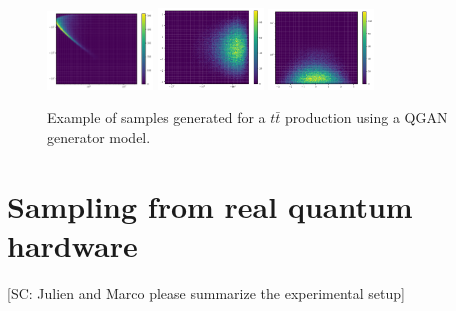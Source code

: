 \documentclass[twocolumn,preprintnumbers,superscriptaddress]{revtex4-2}
\begin{document}
\begin{figure}
  \includegraphics[width=0.25\textwidth]{plots/LHCttbar/s-t_FAKE_100000_100_3_5_4_10000_128_0.5.pdf}%
  \includegraphics[width=0.25\textwidth]{plots/LHCttbar/t-y_FAKE_100000_100_3_5_4_10000_128_0.5.pdf}%
  \includegraphics[width=0.25\textwidth]{plots/LHCttbar/y-s_FAKE_100000_100_3_5_4_10000_128_0.5.pdf}

  \caption{\label{fig:3dgauss}Example of samples generated for a $t\bar{t}$
  production using a QGAN generator model.}
\end{figure}

\section{Sampling from real quantum hardware}
\label{sec:deployment}

{\color{red}[SC: Julien and Marco please summarize the experimental setup]}
\end{document}
